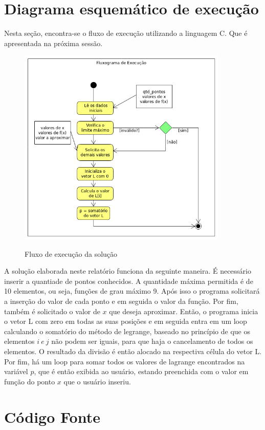 \documentclass[12pt, hidelinks]{article}
\begin{document}
\newpage
\section{Diagrama esquemático de execução}

Nesta seção, encontra-se o fluxo de execução utilizando a linguagem C. Que é apresentada na próxima sessão.
\begin{figure}[!h]
  \centering
  \includegraphics[width=10cm]{figuras/fluxograma.png}\\
  \caption{Fluxo de execução da solução}\label{fig:fluxo}
\end{figure}

A solução elaborada neste relatório funciona da seguinte maneira. É necessário inserir a quantiade de pontos
conhecidos. A quantidade máxima permitida é de 10 elementos, ou seja, funções de grau máximo 9.
Após isso o programa solicitará a inserção do valor de cada ponto e em seguida o valor da função. Por fim,
também é solicitado o valor de $x$ que deseja aproximar.
Então, o programa inicia o vetor L com zero em todas as suas posições e em seguida entra em um loop calculando
o somatório do método de legrange, baseado no princípio de que os elementos $i~e~j$ não podem ser iguais, para que
haja o cancelamento de todos os elementos. O resultado da divisão é então alocado na respectiva célula do vetor L.
Por fim, há um loop para somar todos os valores de lagrange encontrados na variável $p$, que é então exibida ao
usuário, estando preenchida com o valor em função do ponto $x$ que o usuário inseriu.

\newpage
\section{Código Fonte}
\end{document}
